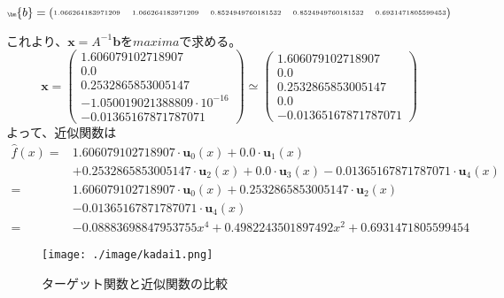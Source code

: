 \begin{enumerate}
  \begin{equation}
    {
      \tiny
      \bm{b} = \begin{pmatrix}
        1.066264183971209 & 1.066264183971209 & 0.8524949760181532 & 0.8524949760181532 & 0.6931471805599453
      \end{pmatrix}
    }
  \end{equation}

  これより、\(\bm{x} = A^{-1} \bm{b}\)を\(maxima\)で求める。
  \begin{equation}
    \bm{x} = \begin{pmatrix}
      1.606079102718907\\
      0.0\\
      0.2532865853005147\\
      -1.050019021388809 \cdot {{10}^{-16}}\\
      -0.01365167871787071
    \end{pmatrix}
    \simeq \begin{pmatrix}
      1.606079102718907\\
      0.0\\
      0.2532865853005147\\
      0.0\\
      -0.01365167871787071
    \end{pmatrix}
  \end{equation}
  よって、近似関数は
  \begin{equation}
    \begin{split}
      \hat{f}\left(x\right)
      =& 1.606079102718907    \cdot \bm{u}_{0}\left(x\right) + 0.0 \cdot \bm{u}_{1}\left(x\right)\\
      &+ 0.2532865853005147   \cdot \bm{u}_{2}\left(x\right) + 0.0 \cdot \bm{u}_{3}\left(x\right)
       - 0.01365167871787071  \cdot \bm{u}_{4}\left(x\right)\\
      =& 1.606079102718907    \cdot \bm{u}_{0}\left(x\right)
       + 0.2532865853005147   \cdot \bm{u}_{2}\left(x\right)\\
      &- 0.01365167871787071  \cdot \bm{u}_{4}\left(x\right)\\
      =& -0.08883698847953755 {{x}^{4}}+0.4982243501897492 {{x}^{2}}+0.6931471805599454
    \end{split}
  \end{equation}

  \begin{figure}[htbp]
    \centering
    \texttt{[image: ./image/kadai1.png]}
    \caption{ターゲット関数と近似関数の比較}
    \label{figure:4_1_a}
  \end{figure}


\end{enumerate}
